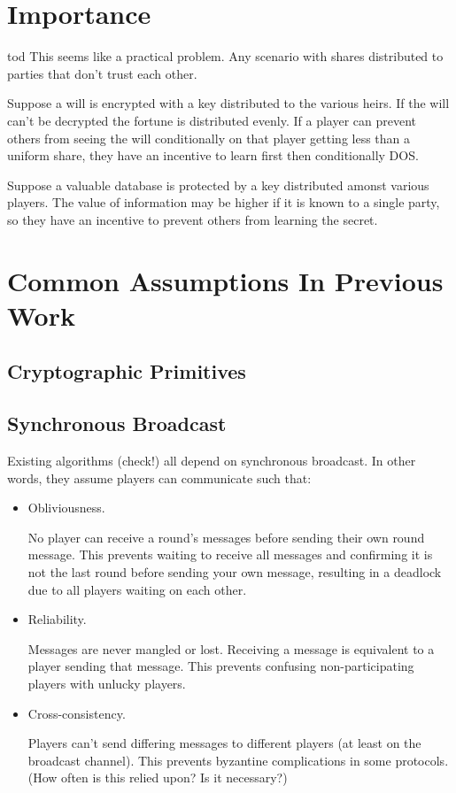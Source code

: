 \documentclass{article}
\begin{document}
\section{Importance}
tod This seems like a practical problem. Any scenario with shares distributed to parties that don't trust each other.

Suppose a will is encrypted with a key distributed to the various heirs. If the will can't be decrypted the fortune is distributed evenly. If a player can prevent others from seeing the will conditionally on that player getting less than a uniform share, they have an incentive to learn first then conditionally DOS.

Suppose a valuable database is protected by a key distributed amonst various players. The value of information may be higher if it is known to a single party, so they have an incentive to prevent others from learning the secret.

\section{Common Assumptions In Previous Work}
\subsection{Cryptographic Primitives}
\subsection{Synchronous Broadcast}
Existing algorithms (check!) all depend on synchronous broadcast. In other words, they assume players can communicate such that:
\begin{itemize}
\item Obliviousness.

	No player can receive a round's messages before sending their own round message. This prevents waiting to receive all messages and confirming it is not the last round before sending your own message, resulting in a deadlock due to all players waiting on each other.

\item Reliability.

	Messages are never mangled or lost. Receiving a message is equivalent to a player sending that message. This prevents confusing non-participating players with unlucky players.

\item Cross-consistency.

	Players can't send differing messages to different players (at least on the broadcast channel). This prevents byzantine complications in some protocols. (How often is this relied upon? Is it necessary?)
\end{itemize}
\end{document}
